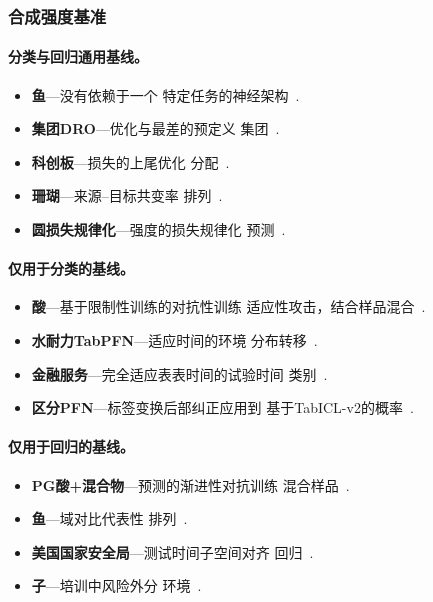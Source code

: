 \subsubsection{合成强度基准}

\paragraph{分类与回归通用基线。}
\begin{itemize}
  \setlength{\itemsep}{1pt}
  \setlength{\parskip}{0pt}
  \item \textbf{鱼}---没有依赖于一个
特定任务的神经架构~\citep{prokhorenkova2018catboost}.
  \item \textbf{集团DRO}---优化与最差的预定义
集团~\citep{sagawa2020groupdro}.
  \item \textbf{科创板}---损失的上尾优化
分配~\citep{rockafellar2000cvar}.
  \item \textbf{珊瑚}---来源--目标共变率
排列~\citep{sun2016deepcoral}.
  \item \textbf{圆损失规律化}---强度的损失规律化
预测~\citep{hasan2025elliptic}.
\end{itemize}

\paragraph{仅用于分类的基线。}
\begin{itemize}
  \setlength{\itemsep}{1pt}
  \setlength{\parskip}{0pt}
  \item \textbf{酸}---基于限制性训练的对抗性训练
适应性攻击，结合样品混合~\citep{simonetto2024caa,yun2019cutmix,
  madry2018adversarial}.
  \item \textbf{水耐力TabPFN}---适应时间的环境
分布转移~\citep{helli2024drifttabpfn}.
  \item \textbf{金融服务}---完全适应表表时间的试验时间
类别~\citep{zhou2025ftat}.
  \item \textbf{区分PFN}---标签变换后部纠正应用到
基于TabICL-v2的概率~\citep{lee2026distpfn}.
\end{itemize}

\paragraph{仅用于回归的基线。}
\begin{itemize}
  \setlength{\itemsep}{1pt}
  \setlength{\parskip}{0pt}
  \item \textbf{PG酸+混合物}---预测的渐进性对抗训练
混合样品~\citep{madry2018adversarial,zhang2018mixup}.
  \item \textbf{鱼}---域对比代表性
排列~\citep{ganin2016domain}.
  \item \textbf{美国国家安全局}---测试时间子空间对齐
回归~\citep{adachi2025ssa}.
  \item \textbf{子}---培训中风险外分
环境~\citep{krueger2021vrex}.
\end{itemize}

